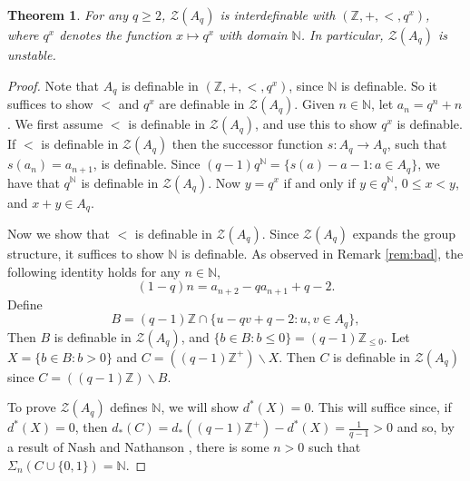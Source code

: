 \documentclass{amsart}
\newcommand{\cZ}{\mathcal{Z}}
\def\N{\mathbb N}
\def\Z{\mathbb Z}
\newtheorem{theorem}{Theorem}[section]
\theoremstyle{definition}
\begin{document}
\begin{theorem}\label{thm:badex}
For any $q\geq 2$, $\cZ(A_q)$ is interdefinable with $(\Z,+,<,q^x)$, where $q^x$ denotes the function $x\mapsto q^x$ with domain $\N$. In particular, $\cZ(A_q)$ is unstable.
\end{theorem}
\begin{proof}
Note that $A_q$ is definable in $(\Z,+,<,q^x)$, since $\N$ is definable. So it suffices to show $<$ and $q^x$ are definable in $\cZ(A_q)$. Given $n\in\N$, let $a_n=q^n+n$. We first assume $<$ is definable in $\cZ(A_q)$, and use this to show $q^x$ is definable.  If $<$ is definable in $\cZ(A_q)$ then the successor function $s: A_q\to A_q$, such that $s(a_n)=a_{n+1}$, is definable. Since $(q-1)q^{\N}=\{s(a)-a-1:a\in A_q\}$, we have that $q^{\N}$ is definable in $\cZ(A_q)$. Now $y=q^x$ if and only if $y\in q^{\N}$, $0\leq x<y$, and $x+y\in A_q$.



Now we show that $<$ is definable in $\cZ(A_q)$. Since $\cZ(A_q)$ expands the group structure, it suffices to show $\N$ is definable. As observed in Remark \ref{rem:bad}, the following identity holds for any $n\in\N$,
\[
(1-q)n=a_{n+2}-qa_{n+1}+q-2.
\]
Define
\[
 B=(q-1)\Z\cap\{u-qv+q-2:u,v\in A_q\},
 \]
Then $B$ is definable in $\cZ(A_q)$, and $\{b\in B:b\leq 0\}=(q-1)\Z_{\leq 0}$. Let $X=\{b\in B:b>0\}$ and $C=((q-1)\Z^+)\backslash X$. Then $C$ is definable in $\cZ(A_q)$ since $C=((q-1)\Z)\backslash B$. 

To prove $\cZ(A_q)$ defines $\N$, we will show $d^*(X)=0$. This will suffice since, if $d^*(X)=0$, then $d_*(C)=d_*((q-1)\Z^+)-d^*(X)=\frac{1}{q-1}>0$ and so, by a result of Nash and Nathanson \cite[Lemma 1]{NaNa}, there is some $n>0$ such that $\Sigma_n(C\cup\{0,1\})=\N$. 


\end{proof}
\end{document}
